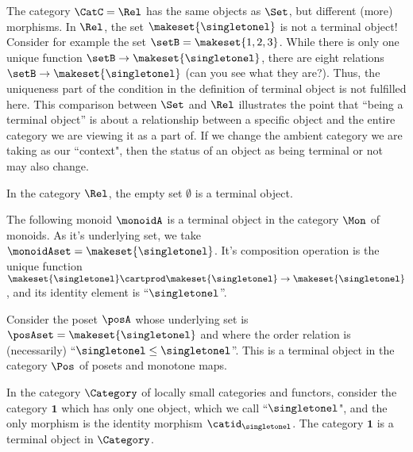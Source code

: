\begin{remark}
The category $\CatC = \Rel$ has the same objects as $\Set$, but different (more) morphisms. In $\Rel$, the set $\makeset{ \singletonel}$ is not a terminal object! Consider for example the set $\setB = \makeset{1,2,3}$. While there is only one unique function $\setB \to \makeset{ \singletonel}$, there are eight relations $\setB \to \makeset{ \singletonel}$ (can you see what they are?). Thus, the uniqueness part of the condition in the definition of terminal object is not fulfilled here. This comparison between $\Set$ and $\Rel$ illustrates the point that ``being a terminal object'' is about a relationship between a specific object and the entire category we are viewing it as a part of. If we change the ambient category we are taking as our ``context", then the status of an object as being terminal or not may also change. 
\end{remark}

\begin{example}\label{exa:term-obj-Rel}
In the category $\Rel$, the empty set $\emptyset$ is a terminal object. 
\end{example}

\begin{example}\label{exa:term-obj-Mon}
The following monoid $\monoidA$ is a terminal object in the category $\Mon$ of monoids. As it's underlying set, we take $\monoidAset = \makeset{ \singletonel}$. It's composition operation is the unique function $\makeset{ \singletonel} \cartprod \makeset{ \singletonel} \to \makeset{ \singletonel}$, and its identity element is ``$\singletonel$''. 
\end{example}

\begin{example}\label{exa:term-obj-Pos}
Consider the poset $\posA$ whose underlying set is $\posAset = \makeset{ \singletonel}$ and where the order relation is (necessarily) ``$\singletonel \leq \singletonel$''. This is a terminal object in the category $\Pos$ of posets and monotone maps. 
\end{example}

\begin{example}\label{exa:term-obj-Cat}
In the category $\Category$ of locally small categories and functors, consider the category $\mathbf{1}$ which has only one object, which we call ``$\singletonel$", and the only morphism is the identity morphism $\catid_\singletonel$. The category $\mathbf{1}$ is a terminal object in $\Category$. 
\end{example}

